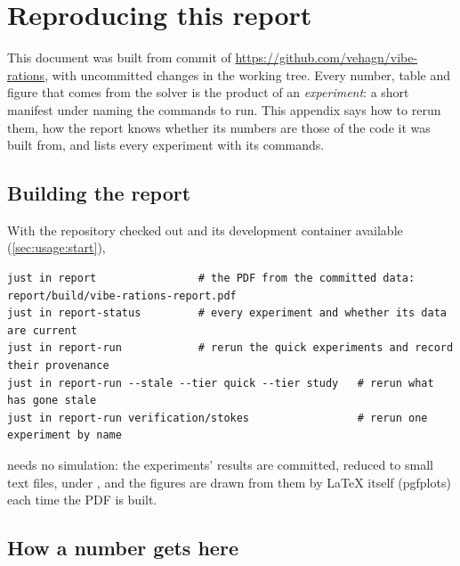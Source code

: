 \section{Reproducing this report}
\label{sec:reproducibility}

This document was built from commit \commit{\buildcommit} of
\url{https://github.com/vehagn/vibe-rations}\ifbuilddirty, \textcolor{vrred}{with
uncommitted changes in the working tree}\fi. Every number, table and figure that
comes from the solver is the product of an \emph{experiment}: a short manifest under
 naming the commands to run. This appendix says how to rerun them,
how the report knows whether its numbers are those of the code it was built from, and lists
every experiment with its commands.

\subsection{Building the report}
\label{sec:reproducibility:build}

With the repository checked out and its development container available
(\cref{sec:usage:start}),
\begin{lstlisting}[style=shell]
just in report                # the PDF from the committed data: report/build/vibe-rations-report.pdf
just in report-status         # every experiment and whether its data are current
just in report-run            # rerun the quick experiments and record their provenance
just in report-run --stale --tier quick --tier study   # rerun what has gone stale
just in report-run verification/stokes                 # rerun one experiment by name
\end{lstlisting}
 needs no simulation: the experiments' results are committed, reduced to
small text files, under , and the figures are drawn from them by LaTeX
itself (pgfplots) each time the PDF is built.

\subsection{How a number gets here}
\label{sec:reproducibility:how}

